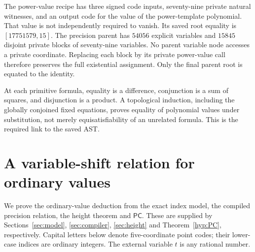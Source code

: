 \documentclass[11pt]{article}
\theoremstyle{definition}
\theoremstyle{remark}
\begin{document}
The power-value recipe has three signed code inputs, seventy-nine
private natural witnesses, and an output code for the value of the
power-template polynomial. That value is not independently required
to vanish. Its saved root equality is $[17751579,15]$.
The precision parent has $54056$ explicit variables and $15845$
disjoint private blocks of seventy-nine variables. No parent variable
node accesses a private coordinate. Replacing each block by its
private power-value call therefore preserves the full existential
assignment. Only the final parent root is equated to the identity.

At each primitive formula, equality is a difference, conjunction is
a sum of squares, and disjunction is a product. A topological induction,
including the globally conjoined fixed equations, proves equality of
polynomial values under substitution, not merely equisatisfiability
of an unrelated formula. This is the required link to the saved AST.

\section{A variable-shift relation for ordinary values}\label{sec:bridge}
We prove the ordinary-value deduction from the exact index model,
the compiled precision relation, the height theorem and $\mathsf{PC}$.
These are supplied by Sections~\ref{sec:model}, \ref{sec:compiler},
\ref{sec:height} and Theorem~\ref{hyp:PC}, respectively. Capital letters below denote five-coordinate point codes;
their lower-case indices are ordinary integers. The external variable
$t$ is any rational number.
\end{document}
